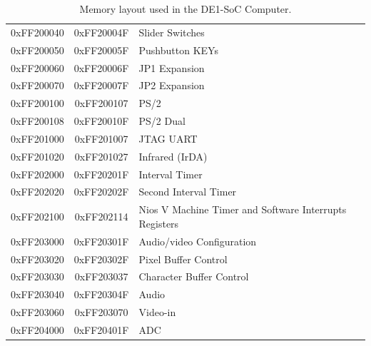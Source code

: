 \documentclass[11pt, twoside, pdftex]{article}
\newcommand{\commonFiles}{../../../common/doc}
\newcommand{\templatePath}{../../../common/templates}
\newcommand{\systemName}{DE1-SoC Computer}
\begin{document}
\begin{table}[h]
\begin{center}
\begin{tabular}{c|c|l}
        \\
            0xFF200040
            & 0xFF20004F
            & Slider Switches
        \\
            0xFF200050
            & 0xFF20005F
            & Pushbutton KEYs
        \\
            0xFF200060
            & 0xFF20006F
            & JP1 Expansion
        \\
            0xFF200070
            & 0xFF20007F
            & JP2 Expansion
        \\
            0xFF200100
            & 0xFF200107
            & PS/2
        \\
            0xFF200108
            & 0xFF20010F
            & PS/2 Dual
        \\
            0xFF201000
            & 0xFF201007
            & JTAG UART
        \\
            0xFF201020
            & 0xFF201027
				& Infrared (IrDA)
        \\
            0xFF202000
            & 0xFF20201F
            & Interval Timer
        \\
            0xFF202020
            & 0xFF20202F
            & Second Interval Timer
        \\
            0xFF202100
            & 0xFF202114
            & Nios V Machine Timer and Software Interrupts Registers
        \\
            0xFF203000
            & 0xFF20301F
            & Audio/video Configuration
        \\
            0xFF203020
            & 0xFF20302F
            & Pixel Buffer Control
        \\
            0xFF203030
            & 0xFF203037
            & Character Buffer Control
        \\
            0xFF203040
            & 0xFF20304F
            & Audio
        \\
            0xFF203060
            & 0xFF203070
            & Video-in
        \\
            0xFF204000
            & 0xFF20401F
            & ADC
        \\
    \end{tabular}
    \caption{Memory layout used in the \systemName.}
    \label{tab:memorylayout}
    \end{center}
\end{table}

% 
\clearpage












\end{document}
